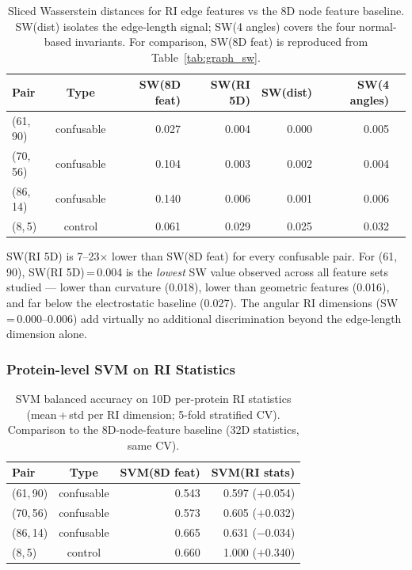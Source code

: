 \begin{table}[ht]
  \centering
  \caption{Sliced Wasserstein distances for RI edge features vs the 8D node
           feature baseline.
           SW(dist) isolates the edge-length signal;
           SW(4 angles) covers the four normal-based invariants.
           For comparison, SW(8D feat) is reproduced from
           Table~\ref{tab:graph_sw}.}
  \label{tab:sw_ri}
  \begin{tabular}{lcrrrrr}
    \toprule
    \textbf{Pair} & \textbf{Type}
      & \textbf{SW(8D feat)} & \textbf{SW(RI 5D)}
      & \textbf{SW(dist)} & \textbf{SW(4 angles)} \\
    \midrule
    (61,\,90) & confusable & 0.027 & 0.004 & 0.000 & 0.005 \\
    (70,\,56) & confusable & 0.104 & 0.003 & 0.002 & 0.004 \\
    (86,\,14) & confusable & 0.140 & 0.006 & 0.001 & 0.006 \\
    (8,\,5)   & control    & 0.061 & 0.029 & 0.025 & 0.032 \\
    \bottomrule
  \end{tabular}
\end{table}

SW(RI 5D) is 7--23$\times$ lower than SW(8D feat) for every confusable pair.
For (61,\,90), SW(RI 5D)\,=\,0.004 is the \emph{lowest} SW value observed
across all feature sets studied --- lower than curvature (0.018), lower than
geometric features (0.016), and far below the electrostatic baseline (0.027).
The angular RI dimensions (SW\,=\,0.000--0.006) add virtually no additional
discrimination beyond the edge-length dimension alone.

\subsubsection{Protein-level SVM on RI Statistics}
\label{sec:analysis:ri:svm}

\begin{table}[ht]
  \centering
  \caption{SVM balanced accuracy on 10D per-protein RI statistics
           (mean\,+\,std per RI dimension; 5-fold stratified CV).
           Comparison to the 8D-node-feature baseline (32D statistics, same CV).}
  \label{tab:svm_ri}
  \begin{tabular}{lcrr}
    \toprule
    \textbf{Pair} & \textbf{Type} & \textbf{SVM(8D feat)} & \textbf{SVM(RI stats)} \\
    \midrule
    (61,\,90) & confusable & 0.543 & 0.597 \;($+$0.054) \\
    (70,\,56) & confusable & 0.573 & 0.605 \;($+$0.032) \\
    (86,\,14) & confusable & 0.665 & 0.631 \;($-$0.034) \\
    (8,\,5)   & control    & 0.660 & 1.000 \;($+$0.340) \\
    \bottomrule
  \end{tabular}
\end{table}

